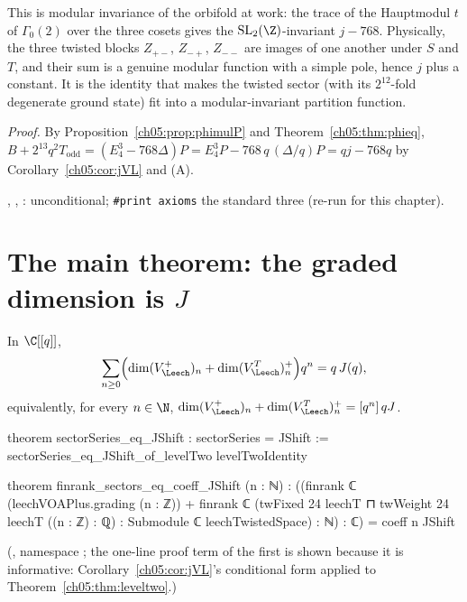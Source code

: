 \begin{physics}
This is modular invariance of the orbifold at work: the trace of the Hauptmodul $t$ of $\Gamma_0(2)$ over the three cosets gives the $\mathrm{SL}_2(\Z)$-invariant $j-768$. Physically, the three twisted blocks $Z_{+-}$, $Z_{-+}$, $Z_{--}$ are images of one another under $S$ and $T$, and their sum is a genuine modular function with a simple pole, hence $j$ plus a constant. It is the identity that makes the twisted sector (with its $2^{12}$-fold degenerate ground state) fit into a modular-invariant partition function.
\end{physics}
\noindent\emph{Proof.} By Proposition~\ref{ch05:prop:phimulP} and Theorem~\ref{ch05:thm:phieq},
$B + 2^{13}q^2T_{\mathrm{odd}} = (E_4^3 - 768\Delta)P = E_4^3P - 768\,q\,(\Delta/q)P = qj - 768q$ by
Corollary~\ref{ch05:cor:jVL} and (A).

\begin{status}
, , : unconditional; \texttt{\#print axioms} the
standard three (re-run for this chapter).
\end{status}

\section{The main theorem: the graded dimension is \texorpdfstring{$J$}{J}}\label{ch05:sec:main}

\begin{theorem}[$\chi = qJ$]\label{ch05:thm:main}
In $\C[[q]]$,
\begin{equation*}
  \sum_{n\ge0}\Bigl(\dim(V_\Leech^+)_n + \dim(V_\Leech^T)^+_n\Bigr)q^n = q\,J(q),
\end{equation*}
equivalently, for every $n\in\N$, $\dim(V_\Leech^+)_n + \dim(V_\Leech^T)^+_n = [q^n]\,qJ$.
\end{theorem}
\begin{leancode}
theorem sectorSeries_eq_JShift : sectorSeries = JShift :=
  sectorSeries_eq_JShift_of_levelTwo levelTwoIdentity

theorem finrank_sectors_eq_coeff_JShift (n : ℕ) :
    ((finrank ℂ (leechVOAPlus.grading (n : ℤ))
      + finrank ℂ (twFixed 24 leechT ⊓ twWeight 24 leechT ((n : ℤ) : ℚ) :
          Submodule ℂ leechTwistedSpace) : ℕ) : ℂ)
      = coeff n JShift
\end{leancode}
(, namespace ; the one-line proof term of the
first is shown because it is informative: Corollary~\ref{ch05:cor:jVL}'s conditional form applied to
Theorem~\ref{ch05:thm:leveltwo}.)

